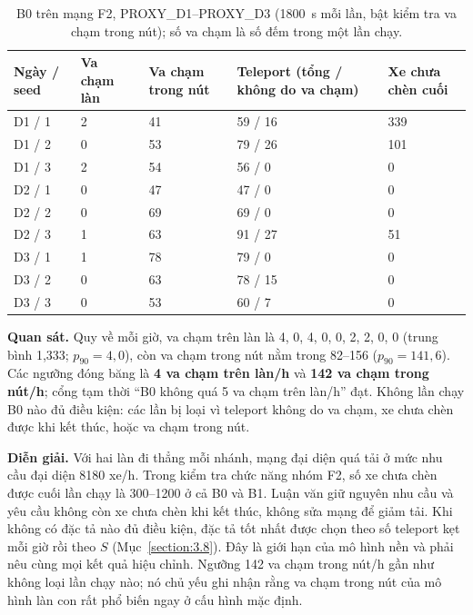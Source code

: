 \documentclass[../DoAn.tex]{subfiles}
\begin{document}
\begin{table}[H]
\centering
\small
\caption{B0 trên mạng F2, PROXY\_D1--PROXY\_D3 (1800~s mỗi lần, bật kiểm tra va chạm trong nút); số va chạm là số đếm trong một lần chạy.}
\label{table:4.r28}
\begin{tabular}{|p{1.6cm}|p{1.8cm}|p{2.0cm}|p{3.4cm}|p{2.2cm}|}
\hline
\textbf{Ngày / seed} & \textbf{Va chạm làn} & \textbf{Va chạm trong nút} & \textbf{Teleport (tổng / không do va chạm)} & \textbf{Xe chưa chèn cuối} \\ \hline
D1 / 1 & 2 & 41 & 59 / 16 & 339 \\ \hline
D1 / 2 & 0 & 53 & 79 / 26 & 101 \\ \hline
D1 / 3 & 2 & 54 & 56 / 0 & 0 \\ \hline
D2 / 1 & 0 & 47 & 47 / 0 & 0 \\ \hline
D2 / 2 & 0 & 69 & 69 / 0 & 0 \\ \hline
D2 / 3 & 1 & 63 & 91 / 27 & 51 \\ \hline
D3 / 1 & 1 & 78 & 79 / 0 & 0 \\ \hline
D3 / 2 & 0 & 63 & 78 / 15 & 0 \\ \hline
D3 / 3 & 0 & 53 & 60 / 7 & 0 \\ \hline
\end{tabular}
\end{table}

\textbf{Quan sát.} Quy về mỗi giờ, va chạm trên làn là 4, 0, 4, 0, 0, 2, 2, 0, 0 (trung bình 1,333; $p_{90} = 4{,}0$), còn va chạm trong nút nằm trong 82--156 ($p_{90} = 141{,}6$). Các ngưỡng đóng băng là \textbf{4 va chạm trên làn/h} và \textbf{142 va chạm trong nút/h}; cổng tạm thời ``B0 không quá 5 va chạm trên làn/h'' đạt. Không lần chạy B0 nào đủ điều kiện: các lần bị loại vì teleport không do va chạm, xe chưa chèn được khi kết thúc, hoặc va chạm trong nút.

\textbf{Diễn giải.} Với hai làn đi thẳng mỗi nhánh, mạng đại diện quá tải ở mức nhu cầu đại diện 8180 xe/h. Trong kiểm tra chức năng nhóm F2, số xe chưa chèn được cuối lần chạy là 300--1200 ở cả B0 và B1. Luận văn giữ nguyên nhu cầu và yêu cầu không còn xe chưa chèn khi kết thúc, không sửa mạng để giảm tải. Khi không có đặc tả nào đủ điều kiện, đặc tả tốt nhất được chọn theo số teleport kẹt mỗi giờ rồi theo $S$ (Mục~\ref{section:3.8}). Đây là giới hạn của mô hình nền và phải nêu cùng mọi kết quả hiệu chỉnh. Ngưỡng 142 va chạm trong nút/h gần như không loại lần chạy nào; nó chủ yếu ghi nhận rằng va chạm trong nút của mô hình làn con rất phổ biến ngay ở cấu hình mặc định.
\end{document}
